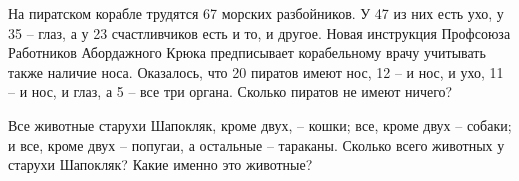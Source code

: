 \begin{thm}
На пиратском корабле трудятся 67 морских разбойников. У 47 из них есть ухо, у 35 – глаз, а у 23 счастливчиков есть и то, и другое. Новая инструкция Профсоюза Работников Абордажного Крюка предписывает корабельному врачу учитывать также наличие носа. Оказалось, что 20 пиратов имеют нос, 12 – и нос, и ухо, 11 – и нос, и глаз, а 5 – все три органа. Сколько пиратов не имеют ничего?
\end{thm}

\begin{thm}
Все животные старухи Шапокляк, кроме двух, – кошки; все, кроме двух – собаки; и все, кроме
двух – попугаи, а остальные – тараканы. Сколько всего животных у старухи Шапокляк? Какие именно это животные?
\end{thm}